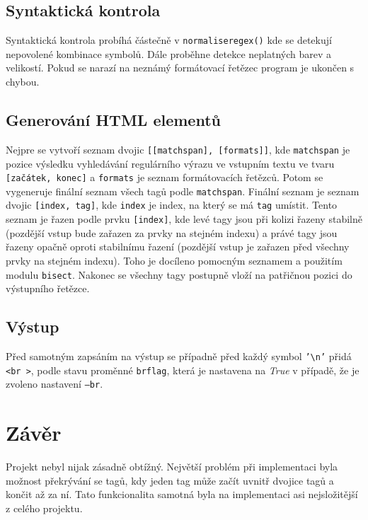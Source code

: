 \documentclass[a4paper, 10pt]{article}
\begin{document}
\subsection{Syntaktická kontrola}
Syntaktická kontrola probíhá částečně v \texttt{normalise\textunderscore regex()} kde se
detekují nepovolené kombinace symbolů. Dále proběhne detekce neplatných barev
a velikostí. Pokud se narazí na neznámý formátovací řetězec program je 
ukončen s chybou.

\subsection{Generování HTML elementů}
Nejpre se vytvoří seznam dvojic \texttt{[[match\textunderscore span], [formats]]}, kde \texttt{match\textunderscore span} je pozice výsledku
vyhledávání regulárního výrazu ve vstupním textu ve tvaru \texttt{[začátek, konec]} a \texttt{formats} 
je seznam formátovacích řetězců. Potom se vygeneruje finální seznam všech tagů podle \texttt{match\textunderscore span}.
Finální seznam je seznam dvojic \texttt{[index, tag]}, kde \texttt{index} je index, na který se má \texttt{tag} umístit.
Tento seznam je řazen podle prvku \texttt{[index]}, kde levé tagy jsou při kolizi řazeny stabilně (pozdější vstup bude zařazen za prvky na stejném indexu)
a právé tagy jsou řazeny opačně oproti stabilnímu řazení (pozdější vstup je zařazen před všechny prvky na stejném indexu).
Toho je docíleno pomocným seznamem a použitím modulu \texttt{bisect}.
Nakonec se všechny tagy postupně vloží na patřičnou pozici do výstupního řetězce.
\subsection{Výstup}
Před samotným zapsáním na výstup se případně před každý symbol \texttt{'\textbackslash n'} přidá
\texttt{<br >}, podle stavu proměnné \texttt{brflag}, která je nastavena na \emph{True} v případě, že je zvoleno nastavení \texttt{--br}.
\section{Závěr}
Projekt nebyl nijak zásadně obtížný. Největší problém při implementaci byla možnost překrývání se tagů, kdy jeden tag může začít uvnitř dvojice tagů a končit až za ní. Tato funkcionalita samotná byla na implementaci asi nejsložitější z celého projektu.
\end{document}
